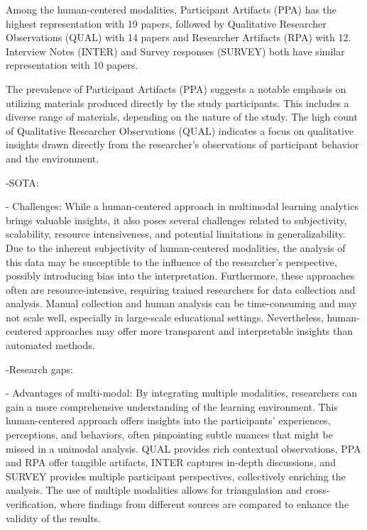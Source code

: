 \documentclass[manuscript,screen,review]{acmart}
\begin{document}
Among the human-centered modalities, Participant Artifacts (PPA) has the highest representation with 19 papers, followed by Qualitative Researcher Observations (QUAL) with 14 papers and Researcher Artifacts (RPA) with 12. Interview Notes (INTER) and Survey responses (SURVEY) both have similar representation with 10 papers. 

The prevalence of Participant Artifacts (PPA) suggests a notable emphasis on utilizing materials produced directly by the study participants. This includes a diverse range of materials, depending on the nature of the study. The high count of Qualitative Researcher Observations (QUAL) indicates a focus on qualitative insights drawn directly from the researcher's observations of participant behavior and the environment.


-SOTA:

- Challenges: While a human-centered approach in multimodal learning analytics brings valuable insights, it also poses several challenges related to subjectivity, scalability, resource intensiveness, and potential limitations in generalizability. Due to the inherent subjectivity of human-centered modalities, the analysis of this data may be susceptible to the influence of the researcher's perspective, possibly introducing bias into the interpretation. Furthermore, these approaches often are resource-intensive, requiring trained researchers for data collection and analysis. Manual collection and human analysis can be time-consuming and may not scale well, especially in large-scale educational settings. Nevertheless, human-centered approaches may offer more transparent and interpretable insights than automated methods.

-Research gaps:

- Advantages of multi-modal: By integrating multiple modalities, researchers can gain a more comprehensive understanding of the learning environment. This human-centered approach offers insights into the participants' experiences, perceptions, and behaviors, often pinpointing subtle nuances that might be missed in a unimodal analysis. QUAL provides rich contextual observations, PPA and RPA offer tangible artifacts, INTER captures in-depth discussions, and SURVEY provides multiple participant perspectives, collectively enriching the analysis. The use of multiple modalities allows for triangulation and cross-verification, where findings from different sources are compared to enhance the validity of the results.
    
\end{document}
